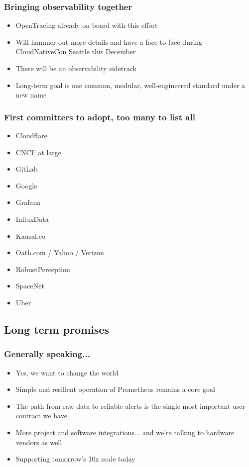 \documentclass[t]{beamer}
\begin{document}
\begin{frame}
	\frametitle{Bringing observability together}
	\begin{itemize}
		\item OpenTracing already on board with this effort
		\item Will hammer out more details and have a face-to-face during CloudNativeCon Seattle this December
		\item There will be an observability sidetrack
		\item Long-term goal is one common, modular, well-engineered standard under a new name
	\end{itemize}
\end{frame}



\begin{frame}
	\frametitle{First committers to adopt, too many to list all}
	\begin{itemize}
		\item Cloudflare
		\item CNCF at large
		\item GitLab
		\item Google
		\item Grafana
		\item InfluxData
		\item Kausal.co
		\item Oath.com / Yahoo / Verizon
		\item RobustPerception
		\item SpaceNet
		\item Uber
	\end{itemize}
\end{frame}


\subsection{Long term promises}

\begin{frame}
	\frametitle{Generally speaking...}
	\begin{itemize}
		\item Yes, we want to change the world
		\item Simple and resilient operation of Prometheus remains a core goal
		\item The path from raw data to reliable alerts is the single most important user contract we have
		\item More project and software integrations... and we're talking to hardware vendors as well
		\item Supporting tomorrow's 10x scale today
	\end{itemize}
\end{frame}
\end{document}
